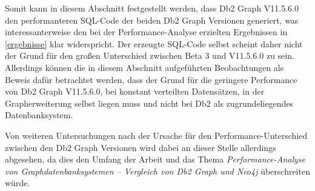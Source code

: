 Somit kann in diesem Abschnitt festgestellt werden, dass Db2 Graph V11.5.6.0 den performanteren SQL-Code der beiden Db2 Graph Versionen generiert, was interessanterweise den bei der Performance-Analyse erzielten Ergebnissen in \autoref{ergebnisse} klar widerspricht. Der erzeugte SQL-Code selbst scheint daher nicht der Grund für den großen Unterschied zwischen Beta 3 und V11.5.6.0 zu sein. Allerdings können die in diesem Abschnitt aufgeführten Beobachtungen als Beweis dafür betrachtet werden, dass der Grund für die geringere Performance von Db2 Graph V11.5.6.0, bei konstant verteilten Datensätzen, in der Grapherweiterung selbst liegen muss und nicht bei Db2 als zugrundeliegendes Datenbanksystem. 

Von weiteren Untersuchungen nach der Ursache für den Performance-Unterschied zwischen den Db2 Graph Versionen wird dabei an dieser Stelle allerdings abgesehen, da dies den Umfang der Arbeit und das Thema \textit{Performance-Analyse von Graphdatenbanksystemen -- Vergleich von Db2 Graph und Neo4j} überschreiten würde.